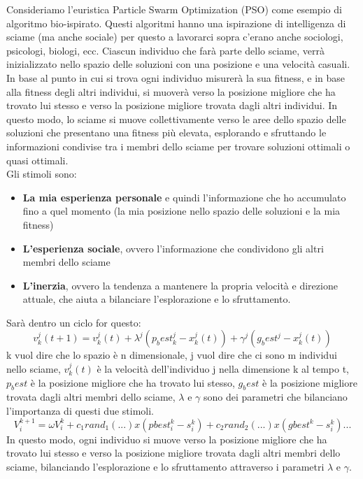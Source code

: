 Consideriamo l'euristica Particle Swarm Optimization (PSO) come esempio di algoritmo
bio-ispirato. Questi algoritmi hanno una ispirazione di intelligenza di sciame (ma anche 
sociale) per questo a lavorarci sopra c'erano anche sociologi, psicologi, biologi, ecc.
Ciascun individuo che farà parte dello sciame, verrà inizializzato nello spazio delle
soluzioni con una posizione e una velocità casuali. 
In base al punto in cui si trova ogni individuo misurerà la sua fitness, e in base
alla fitness degli altri individui, si muoverà verso la posizione migliore che ha 
trovato lui stesso e verso la posizione migliore trovata dagli altri individui.
In questo modo, lo sciame si muove collettivamente verso le aree dello spazio
delle soluzioni che presentano una fitness più elevata, esplorando e sfruttando
le informazioni condivise tra i membri dello sciame per trovare soluzioni ottimali o quasi ottimali.\\

Gli stimoli sono:
\begin{itemize}
    \item \textbf{La mia esperienza personale} e quindi l'informazione che ho accumulato fino a quel momento
    (la mia posizione nello spazio delle soluzioni e la mia fitness)
    \item \textbf{L'esperienza sociale}, ovvero l'informazione che condividono gli altri membri
    dello sciame
    \item \textbf{L'inerzia}, ovvero la tendenza a mantenere la propria velocità e direzione 
    attuale, che aiuta a bilanciare l'esplorazione e lo sfruttamento.
\end{itemize}
Sarà dentro un ciclo for questo:
$$v_k^j(t+1)=v_k^j(t)+\lambda^j(p_best^j_k-x_k^j(t))+\gamma^j(g_best^j-x_k^j(t))$$
k vuol dire che lo spazio è n dimensionale, j vuol dire che ci sono m individui nello
sciame, $v_k^j(t)$ è la velocità dell'individuo j nella dimensione k al tempo t,
$p_best$ è la posizione migliore che ha trovato lui stesso, $g_best$ è la posizione 
migliore trovata dagli altri membri dello sciame, $\lambda$ e $\gamma$ sono dei 
parametri che bilanciano l'importanza di questi due stimoli.\\
$$V_i^{k+1}=\omega V_i^k+c_1rand_1(...)x(pbest_i^k-s_i^k)+c_2rand_2(...)x(gbest^k-s_i^k)...$$
In questo modo, ogni individuo si muove verso la posizione migliore che ha trovato lui stesso
e verso la posizione migliore trovata dagli altri membri dello sciame, bilanciando
l'esplorazione e lo sfruttamento attraverso i parametri $\lambda$ e $\gamma$.

